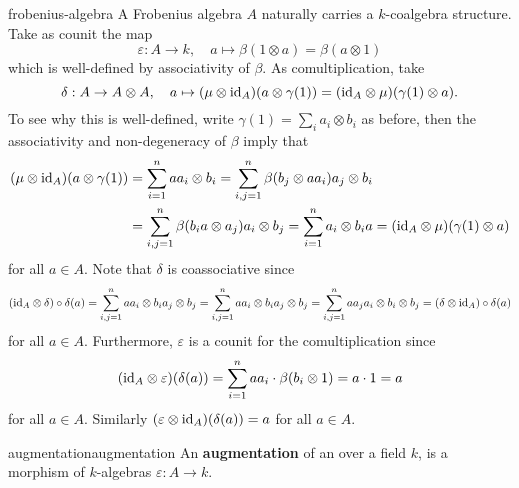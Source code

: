 \begin{example}{frobenius-algebra}
    A Frobenius algebra $A$ naturally carries a $k$-coalgebra structure. Take as counit the map
    \[ \varepsilon : A \to k, \quad a \mapsto \beta(1 \otimes a) = \beta(a \otimes 1) \]
    which is well-defined by associativity of $\beta$. As comultiplication, take
    \[ \delta : A \to A \otimes A, \quad a \mapsto (\mu \otimes \text{id}_A)(a \otimes \gamma(1)) = (\text{id}_A \otimes \mu)(\gamma(1) \otimes a) . \]
    To see why this is well-defined, write $\gamma(1) = \sum_i a_i \otimes b_i$ as before, then the associativity and non-degeneracy of $\beta$ imply that
    \[ \begin{aligned}
        (\mu \otimes \text{id}_A)(a \otimes \gamma(1)) &= \sum_{i = 1}^{n} a a_i \otimes b_i = \sum_{i,j = 1}^{n} \beta(b_j \otimes a a_i) a_j \otimes b_i \\ &= \sum_{i,j = 1}^{n} \beta(b_i a \otimes a_j) a_i \otimes b_j = \sum_{i = 1}^{n} a_i \otimes b_i a = (\text{id}_A \otimes \mu)(\gamma(1) \otimes a) 
    \end{aligned} \]
    for all $a \in A$. Note that $\delta$ is coassociative since
    \[ (\text{id}_A \otimes \delta) \circ \delta(a) = \sum_{i, j = 1}^{n} a a_i \otimes b_i a_j \otimes b_j = \sum_{i, j = 1}^{n} a a_i \otimes b_i a_j \otimes b_j = \sum_{i, j = 1}^{n} a a_j a_i \otimes b_i \otimes b_j = (\delta \otimes \text{id}_A) \circ \delta(a) \]
    for all $a \in A$. Furthermore, $\varepsilon$ is a counit for the comultiplication since
    \[ (\text{id}_A \otimes \varepsilon)(\delta(a)) = \sum_{i = 1}^{n} a a_i \cdot \beta(b_i \otimes 1) = a \cdot 1 = a \]
    for all $a \in A$. Similarly $(\varepsilon \otimes \text{id}_A)(\delta(a)) = a$ for all $a \in A$.
\end{example}

\begin{topic}{augmentation}{augmentation}
    An \textbf{augmentation} of an  over a field $k$, is a morphism of $k$-algebras $\varepsilon : A \to k$.
\end{topic}
